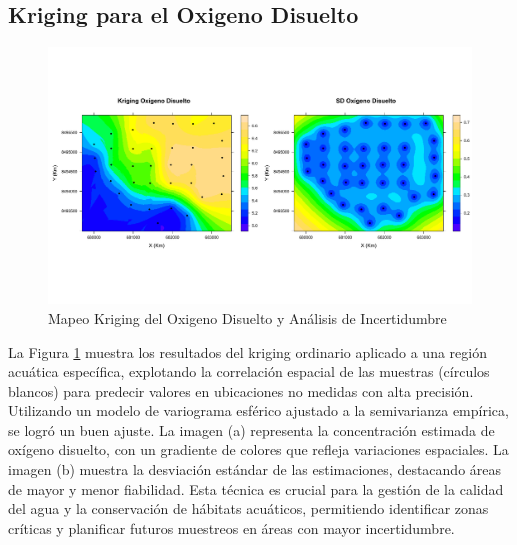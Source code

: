 \subsection{Kriging para el Oxigeno Disuelto}
\begin{figure}[!htb]
    \centering
    \includegraphics[width=1\linewidth]{Figuras_AED/ESTIMACION/OD_KRIGING.pdf}
    \caption{Mapeo Kriging del Oxigeno Disuelto y Análisis de Incertidumbre}
    \label{fig:enter-labelcdf}
\end{figure}

 La Figura \ref{fig:enter-labelcdf} muestra los resultados del kriging ordinario aplicado a una región acuática específica, explotando la correlación espacial de las muestras (círculos blancos) para predecir valores en ubicaciones no medidas con alta precisión. Utilizando un modelo de variograma esférico ajustado a la semivarianza empírica, se logró un buen ajuste. La imagen (a) representa la concentración estimada de oxígeno disuelto, con un gradiente de colores que refleja variaciones espaciales. La imagen (b) muestra la desviación estándar de las estimaciones, destacando áreas de mayor y menor fiabilidad. Esta técnica es crucial para la gestión de la calidad del agua y la conservación de hábitats acuáticos, permitiendo identificar zonas críticas y planificar futuros muestreos en áreas con mayor incertidumbre.


